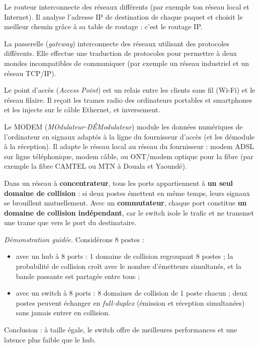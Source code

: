 \documentclass[11pt]{article}
\newcommand{\cle}[1]{{\popxbold\color{popdark}#1}}
\begin{document}
\begin{definition}[Routeur]
Le \cle{routeur} interconnecte des \cle{réseaux différents} (par exemple ton réseau local et Internet). Il analyse l'\cle{adresse IP} de destination de chaque paquet et choisit le \cle{meilleur chemin} grâce à sa table de routage : c'est le routage IP.
\end{definition}

\begin{definition}
La \cle{passerelle} (\emph{gateway}) interconnecte des réseaux utilisant des \cle{protocoles différents}. Elle effectue une \cle{traduction de protocoles} pour permettre à deux mondes incompatibles de communiquer (par exemple un réseau industriel et un réseau TCP/IP).
\end{definition}

\begin{definition}
Le \cle{point d'accès} (\emph{Access Point}) est un relais entre les clients \cle{sans fil} (Wi-Fi) et le réseau \cle{filaire}. Il reçoit les trames radio des ordinateurs portables et smartphones et les injecte sur le câble Ethernet, et inversement.
\end{definition}

\begin{definition}[MODEM]
Le \cle{MODEM} (\emph{MOdulateur-DÉModulateur}) \cle{module} les données numériques de l'ordinateur en signaux adaptés à la ligne du fournisseur d'accès (et les \cle{démodule} à la réception). Il adapte le réseau local au réseau du fournisseur : modem ADSL sur ligne téléphonique, modem câble, ou ONT/modem optique pour la fibre (par exemple la fibre CAMTEL ou MTN à Douala et Yaoundé).
\end{definition}

\begin{propriete}
Dans un réseau à \textbf{concentrateur}, tous les ports appartiennent à \textbf{un seul domaine de collision} : si deux postes émettent en même temps, leurs signaux se brouillent mutuellement. Avec un \textbf{commutateur}, chaque port constitue \textbf{un domaine de collision indépendant}, car le switch isole le trafic et ne transmet une trame que vers le port du destinataire.

\emph{Démonstration guidée.} Considérons 8 postes :
\begin{itemize}
\item avec un hub à 8 ports : 1 domaine de collision regroupant 8 postes ; la probabilité de collision croît avec le nombre d'émetteurs simultanés, et la bande passante est partagée entre tous ;
\item avec un switch à 8 ports : 8 domaines de collision de 1 poste chacun ; deux postes peuvent échanger en \emph{full-duplex} (émission et réception simultanées) sans jamais entrer en collision.
\end{itemize}
Conclusion : à taille égale, le switch offre de meilleures performances et une latence plus faible que le hub.
\end{propriete}
\end{document}
